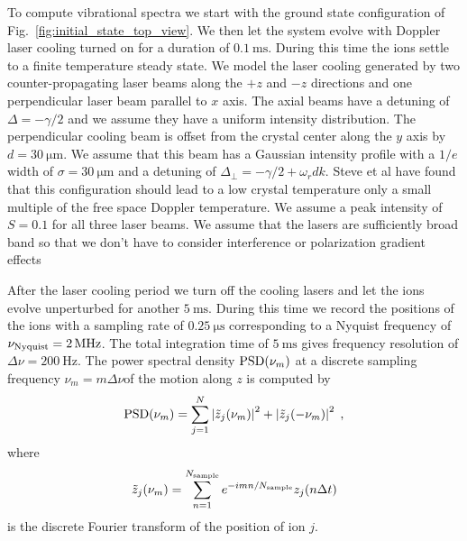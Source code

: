 \documentclass[aps, pra, preprint]{revtex4-1}
\begin{document}
To compute vibrational spectra we start with the ground state
configuration of Fig.~\ref{fig:initial_state_top_view}. We then
let the system evolve with Doppler laser cooling turned on for a
duration of $\SI{0.1}{\milli\second}$. During this time the ions
settle to a finite temperature steady state. We model the laser
cooling generated by two counter-propagating laser beams along
the $+z$ and $-z$ directions and one perpendicular laser beam
parallel to $x$ axis. The axial beams have a detuning of
$\Delta=-\gamma/2$ and we assume they have a uniform intensity
distribution. The perpendicular cooling beam is offset from the
crystal center along the $y$ axis by $d=\SI{30}{\micro\meter}$.
We assume that this beam has a Gaussian intensity profile with a
$1/e$ width of $\sigma=\SI{30}{\micro\meter}$ and a detuning of
$\Delta_\perp=-\gamma/2 +\omega_rdk$. Steve et al  have found that this configuration should
lead to a low crystal temperature only a small multiple of the
free space Doppler temperature. We assume a peak intensity of
$S=0.1$ for all three laser beams. We assume that the lasers are
sufficiently broad band so that we don't have to consider
interference or polarization gradient effects~

After the laser cooling period we turn off the cooling lasers and
let the ions evolve unperturbed for another
$\SI{5}{\milli\second}$. During this time we record the positions
of the ions with a sampling rate of $\SI{0.25}{\micro\second}$
corresponding to a Nyquist frequency of $\nu_{\rm
  Nyquist}=\SI{2}{\mega\hertz}$. The total integration time of
$\SI{5}{\milli\second}$ gives frequency resolution of
$\Delta\nu=\SI{200}{\hertz}$. The power spectral density ${\rm
  PSD}(\nu_m)$ at a discrete sampling frequency $\nu_m =
m\Delta\nu$of the motion along $z$ is computed by
\begin{equation}
  {\rm PSD}(\nu_m)=
  \sum_{j=1}^N\left| \tilde{z}_j(\nu_m) \right|^2 +
  \left| \tilde{z}_j(-\nu_m) \right|^2\;,
\end{equation}
where
\begin{equation}
  \tilde{z}_j(\nu_m)=
  \sum_{n=1}^{N_{\rm sample}}e^{-imn/N_{\rm sample}}z_j(n\Delta t)
\end{equation}
is the discrete Fourier transform of the position of ion $j$.
\end{document}
